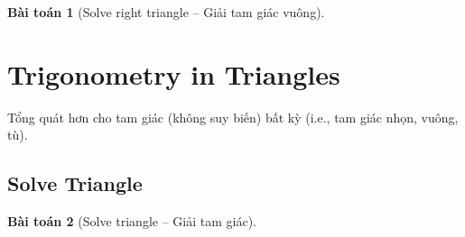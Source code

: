 \documentclass{article}
\newtheorem{baitoan}{Bài toán}
\begin{document}
\begin{baitoan}[Solve right triangle -- Giải tam giác vuông]
	
\end{baitoan}


\section{Trigonometry in Triangles}
Tổng quát hơn cho tam giác (không suy biến) bất kỳ (i.e., tam giác nhọn, vuông, tù).

\subsection{Solve Triangle}

\begin{baitoan}[Solve triangle -- Giải tam giác]
	
\end{baitoan}


\printbibliography[heading=bibintoc]
\end{document}
